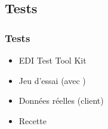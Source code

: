 \subsection{Tests}

\begin{frame}
	\frametitle{Tests}
	
	\begin{itemize}
		\item \og EDI Test Tool Kit \fg\sautligne
		
		\item Jeu d'essai (avec )\sautligne
		
		\item Données réelles (client)\sautligne
		
		\item Recette
	\end{itemize}
\end{frame}
